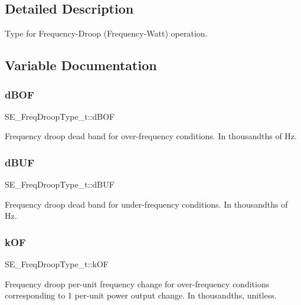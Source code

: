 \subsection{Detailed Description}
Type for Frequency-\/\+Droop (Frequency-\/\+Watt) operation. 

\subsection{Variable Documentation}
\mbox{\label{group__FreqDroopType_gac94af74f0f95cfdfd309edf0b1332b60}} 
\subsubsection{\texorpdfstring{d\+B\+OF}{dBOF}}
{\footnotesize\ttfamily S\+E\+\_\+\+Freq\+Droop\+Type\+\_\+t\+::d\+B\+OF}

Frequency droop dead band for over-\/frequency conditions. In thousandths of Hz. \mbox{\label{group__FreqDroopType_ga4b8bb547bb1d3615836aa7fda01d55fe}} 
\subsubsection{\texorpdfstring{d\+B\+UF}{dBUF}}
{\footnotesize\ttfamily S\+E\+\_\+\+Freq\+Droop\+Type\+\_\+t\+::d\+B\+UF}

Frequency droop dead band for under-\/frequency conditions. In thousandths of Hz. \mbox{\label{group__FreqDroopType_ga34e6fdc066c8a02a83fd66e680b53645}} 
\subsubsection{\texorpdfstring{k\+OF}{kOF}}
{\footnotesize\ttfamily S\+E\+\_\+\+Freq\+Droop\+Type\+\_\+t\+::k\+OF}

Frequency droop per-\/unit frequency change for over-\/frequency conditions corresponding to 1 per-\/unit power output change. In thousandths, unitless. \mbox{\label{group__FreqDroopType_gaa2d7a3faec478c0774843e3082b281c4}} 
